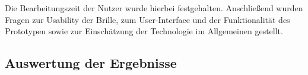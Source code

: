 Die Bearbeitungszeit der Nutzer wurde hierbei festgehalten. Anschließend wurden Fragen zur Usability der Brille, zum User-Interface und der Funktionalität des Prototypen sowie zur Einschätzung der Technologie im Allgemeinen gestellt.
%
%
%
%
%
%
%
\subsection{Auswertung der Ergebnisse}
\label{sec:Auswertung_der_Ergebnisse}
